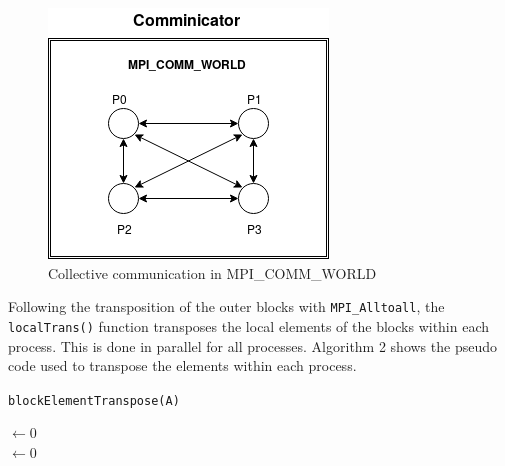 \documentclass[11pt,conference]{IEEEtran}
\begin{document}
\begin{figure}[h!]
    \centering
    \includegraphics[scale=0.4]{world.png}
    \caption{Collective communication in MPI\_COMM\_WORLD}
    \label{7}
\end{figure}

\noindent
Following the transposition of the outer blocks with \texttt{MPI\_Alltoall}, the \texttt{localTrans()} function transposes the local elements of the blocks within each process. This is done in parallel for all processes. Algorithm 2 shows the pseudo code used to transpose the elements within each process.

\begin{algorithm}[h!]


\caption{\texttt{blockElementTranspose(A)}}

\otherCol$\leftarrow$0
\\
\otherRow$\leftarrow$0


\label{block}
\end{algorithm}
\end{document}
